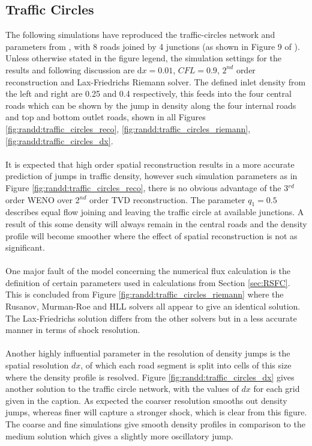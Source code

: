 \subsection{Traffic Circles}
\label{randd:trafficcircles}

	The following simulations have reproduced the traffic-circles network and parameters from \cite{Bretti07}, with 8 roads joined by 4 junctions (as shown in Figure 9 of \cite{Bretti07}). Unless otherwise stated in the figure legend, the simulation settings for the results and following discussion are d$x=0.01$, $CFL=0.9$, $2^{nd}$ order reconstruction and Lax-Friedrichs Riemann solver. The defined inlet density from the left and right are 0.25 and 0.4 respectively, this feeds into the four central roads which can be shown by the jump in density along the four internal roads and top and bottom outlet roads, shown in all Figures \ref{fig:randd:traffic_circles_reco}, \ref{fig:randd:traffic_circles_riemann}, \ref{fig:randd:traffic_circles_dx}. 
	\\ \\
	It is expected that high order spatial reconstruction results in a more accurate prediction of jumps in traffic density, however  such simulation parameters as in Figure \ref{fig:randd:traffic_circles_reco}, there is no obvious advantage of the 3$^{rd}$ order WENO over 2$^{nd}$ order TVD reconstruction. The parameter $q_1=0.5$ describes equal flow joining and leaving the traffic circle at available junctions. A result of this some density will always remain in the central roads and the density profile will become smoother where the effect of spatial reconstruction is not as significant.
	\\ \\
	One major fault of the model concerning the numerical flux calculation is the definition of certain parameters used in calculations from Section \ref{sec:RSFC}. This is concluded from Figure \ref{fig:randd:traffic_circles_riemann} where the Rusanov, Murman-Roe and HLL solvers all appear to give an identical solution. The Lax-Friedrichs solution differs from the other solvers but in a less accurate manner in terms of shock resolution.
	\\ \\ 
	Another highly influential parameter in the resolution of density jumps is the spatial resolution $dx$, of which each road segment is split into cells of this size where the density profile is resolved. Figure \ref{fig:randd:traffic_circles_dx} gives another solution to the traffic circle network, with the values of $dx$ for each grid given in the caption. As expected the coarser resolution smooths out density jumps, whereas finer will capture a stronger shock, which is clear from this figure. The coarse and fine simulations give smooth density profiles in comparison to the medium solution which gives a slightly more oscillatory jump. 
